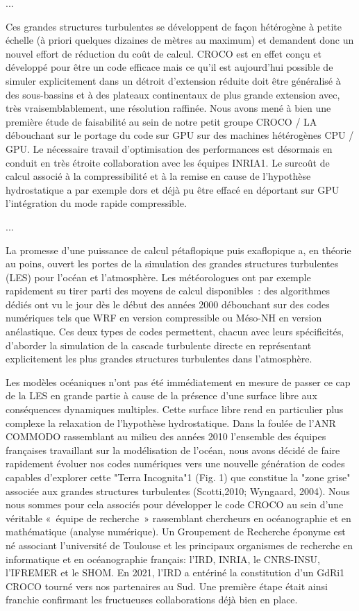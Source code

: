 ...

Ces grandes structures turbulentes se développent de façon hétérogène à petite échelle (à priori quelques dizaines de mètres au maximum) et demandent donc un nouvel effort de réduction du coût de calcul. CROCO est en effet conçu et développé pour être un code efficace mais ce qu'il est aujourd'hui possible de simuler explicitement dans un détroit d'extension réduite doit être généralisé à des sous-bassins et à des plateaux continentaux de plus grande extension avec, très vraisemblablement, une résolution raffinée. Nous avons mené à bien une première étude de faisabilité au sein de notre petit groupe CROCO / LA débouchant sur le portage du code sur GPU sur des machines hétérogènes CPU / GPU. Le nécessaire travail d’optimisation des performances est désormais en conduit en très étroite collaboration avec les équipes INRIA1. Le surcoût de calcul associé à la compressibilité et à la remise en cause de l'hypothèse hydrostatique a par exemple dors et déjà pu être effacé en déportant sur GPU l'intégration du mode rapide compressible.

...

La promesse d’une puissance de calcul pétaflopique puis exaflopique a, en théorie au poins, ouvert les portes de la simulation des grandes structures turbulentes (LES) pour l’océan et l’atmosphère. Les météorologues ont par exemple rapidement su tirer parti des moyens de calcul disponibles : des algorithmes dédiés ont vu le jour dès le début des années 2000 débouchant sur des codes numériques tels que WRF en version compressible ou Méso-NH en version anélastique. Ces deux types de codes permettent, chacun avec leurs spécificités, d’aborder la simulation de la cascade turbulente directe en représentant explicitement les plus grandes structures turbulentes dans l’atmosphère.

Les modèles océaniques n’ont pas été immédiatement en mesure de passer ce cap de la LES en grande partie à cause de la présence d’une surface libre aux conséquences dynamiques multiples. Cette surface libre rend en particulier plus complexe la relaxation de l’hypothèse hydrostatique. Dans la foulée de l’ANR COMMODO rassemblant au milieu des années 2010 l’ensemble des équipes françaises travaillant sur la modélisation de l’océan, nous avons décidé de faire rapidement évoluer nos codes numériques vers une nouvelle génération de codes capables d'explorer cette "Terra Incognita"1 (Fig. 1) que constitue la "zone grise" associée aux grandes structures turbulentes (Scotti,2010; Wyngaard, 2004). Nous nous sommes pour cela associés pour développer le code CROCO au sein d’une véritable « équipe de recherche » rassemblant chercheurs en océanographie et en mathématique (analyse numérique). Un Groupement de Recherche éponyme est né associant l’université de Toulouse et les principaux organismes de recherche en informatique et en océanographie français: l’IRD, INRIA, le CNRS-INSU, l’IFREMER et le SHOM. En 2021, l’IRD a entériné la constitution d’un GdRi1 CROCO tourné vers nos partenaires au Sud. Une première étape était ainsi franchie confirmant les fructueuses collaborations déjà bien en place.

